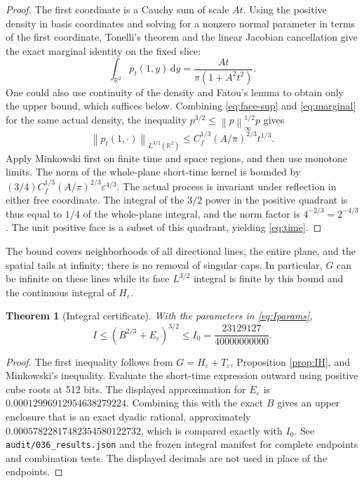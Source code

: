 \documentclass[11pt,a4paper]{article}
\newtheorem{theorem}{Theorem}[section]
\theoremstyle{definition}\newtheorem{definition}[theorem]{Definition}
\theoremstyle{remark}\newtheorem{remark}[theorem]{Remark}
\newcommand{\R}{\mathbb R}
\newcommand{\dd}{\,\mathrm d}
\newcommand{\norm}[1]{\left\lVert#1\right\rVert}
\newcommand{\src}[1]{\nolinkurl{#1}}
\begin{document}
\begin{proof}
The first coordinate is a Cauchy sum of scale $At$. Using the positive density in basis coordinates and solving for a nonzero normal parameter in terms of the first coordinate, Tonelli's theorem and the linear Jacobian cancellation give the exact marginal identity on the fixed slice:
\begin{equation}\label{eq:marginal}
 \int_{\R^2}p_t(1,y)\dd y=\frac{At}{\pi(1+A^2t^2)}.
\end{equation}
One could also use continuity of the density and Fatou's lemma to obtain only the upper bound, which suffices below.
Combining \eqref{eq:face-sup} and \eqref{eq:marginal} for the same actual density, the inequality $p^{3/2}\le\norm p_\infty^{1/2}p$ gives
\[
 \norm{p_t(1,\cdot)}_{L^{3/2}(\R^2)}
 \le C_f^{1/3}(A/\pi)^{2/3}t^{1/3}.
\]
Apply Minkowski first on finite time and space regions, and then use monotone limits. The norm of the whole-plane short-time kernel is bounded by
$(3/4)C_f^{1/3}(A/\pi)^{2/3}\varepsilon^{4/3}$.
The actual process is invariant under reflection in either free coordinate. The integral of the $3/2$ power in the positive quadrant is thus equal to $1/4$ of the whole-plane integral, and the norm factor is $4^{-2/3}=2^{-4/3}$. The unit positive face is a subset of this quadrant, yielding \eqref{eq:time}.
\end{proof}

The bound covers neighborhoods of all directional lines, the entire plane, and the spatial tails at infinity; there is no removal of singular caps. In particular, $G$ can be infinite on these lines while its face $L^{3/2}$ integral is finite by this bound and the continuous integral of $H_\varepsilon$.

\begin{theorem}[Integral certificate]\label{thm:I}
With the parameters in \eqref{eq:Iparams},
\begin{equation}\label{eq:I0}
 I\le (B^{2/3}+E_\varepsilon)^{3/2}
 \le I_0=\frac{23129127}{40000000000}.
\end{equation}
\end{theorem}
\begin{proof}
The first inequality follows from $G=H_\varepsilon+T_\varepsilon$, Proposition \ref{prop:IH}, and Minkowski's inequality. Evaluate the short-time expression outward using positive cube roots at 512 bits. The displayed approximation for $E_\varepsilon$ is $0.00012996912954638279224$. Combining this with the exact $B$ gives an upper enclosure that is an exact dyadic rational, approximately
$0.00057822817482354580122732$, which is compared exactly with $I_0$. See \src{audit/036_results.json} and the frozen integral manifest for complete endpoints and combination tests. The displayed decimals are not used in place of the endpoints.
\end{proof}
\end{document}
